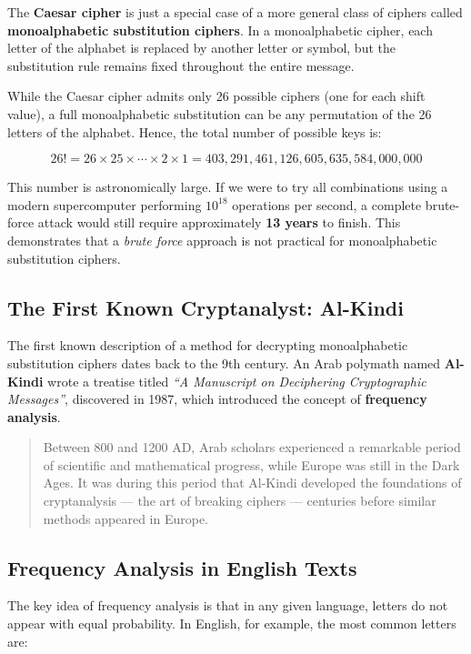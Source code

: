 The \textbf{Caesar cipher} is just a special case of a more general class of ciphers called \textbf{monoalphabetic substitution ciphers}.  
In a monoalphabetic cipher, each letter of the alphabet is replaced by another letter or symbol, but the substitution rule remains fixed throughout the entire message.

While the Caesar cipher admits only 26 possible ciphers (one for each shift value), a full monoalphabetic substitution can be any permutation of the 26 letters of the alphabet. Hence, the total number of possible keys is:

\[
26! = 26 \times 25 \times \cdots \times 2 \times 1 = 403{,}291{,}461{,}126{,}605{,}635{,}584{,}000{,}000
\]

This number is astronomically large. If we were to try all combinations using a modern supercomputer performing $10^{18}$ operations per second, a complete brute-force attack would still require approximately \textbf{13 years} to finish.  
This demonstrates that a \emph{brute force} approach is not practical for monoalphabetic substitution ciphers.

\subsection{The First Known Cryptanalyst: Al-Kindi}

The first known description of a method for decrypting monoalphabetic substitution ciphers dates back to the 9th century.  
An Arab polymath named \textbf{Al-Kindi} wrote a treatise titled \textit{“A Manuscript on Deciphering Cryptographic Messages”}, discovered in 1987, which introduced the concept of \textbf{frequency analysis}.

\begin{quote}
Between 800 and 1200 AD, Arab scholars experienced a remarkable period of scientific and mathematical progress, while Europe was still in the Dark Ages.  
It was during this period that Al-Kindi developed the foundations of cryptanalysis — the art of breaking ciphers — centuries before similar methods appeared in Europe.
\end{quote}

\subsection{Frequency Analysis in English Texts}

The key idea of frequency analysis is that in any given language, letters do not appear with equal probability.  
In English, for example, the most common letters are:


